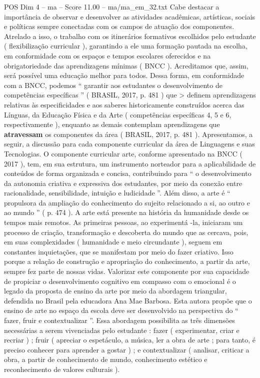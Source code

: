 \begin{textsample}{POS Dim 4 – ma – Score 11.00 – ma/ma\_em\_32.txt}
Cabe destacar a importância de observar e desenvolver as atividades acadêmicas, artísticas, sociais e políticas sempre conectadas com os campos de atuação dos componentes.
Atrelado a isso, o trabalho com os itinerários formativos escolhidos pelo estudante ( flexibilização curricular ), garantindo a ele uma formação pautada na escolha, em conformidade com os espaços e tempos escolares oferecidos e na obrigatoriedade das aprendizagens mínimas ( BNCC ).
Acreditamos que, assim, será possível uma educação melhor para todos.
Dessa forma, em conformidade com a BNCC, podemos “ garantir aos estudantes o desenvolvimento de competências específicas ” ( BRASIL, 2017, p. 481 ) que > definem aprendizagens relativas às especificidades e aos saberes historicamente construídos acerca das Línguas, da Educação Física e da Arte ( competências específicas 4, 5 e 6, respectivamente ), enquanto as demais contemplam aprendizagens que \textbf{atravessam} os componentes da área ( BRASIL, 2017, p. 481 ).
Apresentamos, a seguir, a discussão para cada componente curricular da área de Linguagens e suas Tecnologias.
O componente curricular arte, conforme apresentado na BNCC ( 2017 ), tem, em sua estrutura, um instrumento norteador para a aplicabilidade de conteúdos de forma organizada e concisa, contribuindo para “ o desenvolvimento da autonomia criativa e expressiva dos estudantes, por meio da conexão entre racionalidade, sensibilidade, intuição e ludicidade ”.
Além disso, a arte é “ propulsora da ampliação do conhecimento do sujeito relacionado a si, ao outro e ao mundo ” ( p. 474 ).
A arte está presente na história da humanidade desde os tempos mais remotos.
As primeiras pessoas, ao experimentá -la, iniciaram um processo de criação, transformação e descoberta do mundo que as cercava, pois, em suas complexidades ( humanidade e meio circundante ), seguem em constantes inquietações, que se manifestam por meio do fazer criativo.
Isso porque a relação de construção e apropriação do conhecimento, a partir da arte, sempre fez parte de nossas vidas.
Valorizar este componente por sua capacidade de propiciar o desenvolvimento cognitivo em compasso com o emocional é o legado da proposta de ensino da arte por meio da abordagem triangular, defendida no Brasil pela educadora Ana Mae Barbosa.
Esta autora propõe que o ensino de arte no espaço da escola deve ser desenvolvido na perspectiva do “ fazer, fruir e contextualizar ”.
Essa abordagem possibilita as três dimensões necessárias a serem vivenciadas pelo estudante : fazer ( experimentar, criar e recriar ) ; fruir ( apreciar o espetáculo, a música, ler a obra de arte ; para tanto, é preciso conhecer para aprender a gostar ) ; e contextualizar ( analisar, criticar a obra, a partir de conhecimento de mundo, conhecimento estético e reconhecimento de valores culturais ).

\end{textsample}
